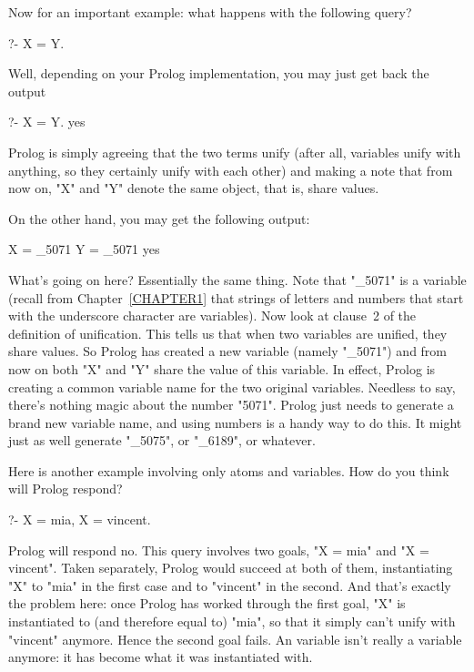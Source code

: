 Now for an important example: what happens with the following query?
\begin{LPNcodedisplay}
?- X = Y.
\end{LPNcodedisplay}
%
Well, depending on your Prolog implementation, you may just get back
the output
\begin{LPNcodedisplay}
?- X = Y.
yes
\end{LPNcodedisplay}
%
Prolog is simply agreeing that the two terms unify (after all,
variables unify with anything, so they certainly unify with each
other) and making a note that from now on, "X" and "Y" denote the same
object, that is, share values.

On the other hand, you may get the following output:
\begin{LPNcodedisplay}
X = _5071
Y = _5071
yes
\end{LPNcodedisplay}
What's going on here?  Essentially the same thing. Note that "_5071"
is a variable (recall from Chapter~\ref{CHAPTER1} that strings of
letters and numbers that start with the underscore character are
variables).  Now look at clause~2 of the definition of
unification. This tells us that when two variables are unified, they
share values. So Prolog has created a new variable (namely "_5071")
and from now on both "X" and "Y" share the value of this variable. In
effect, Prolog is creating a common variable name for the two original
variables.  Needless to say, there's nothing magic about the number
"5071".  Prolog just needs to generate a brand new variable name, and
using numbers is a handy way to do this. It might just as well
generate "_5075", or "_6189", or whatever.

Here is another example involving only atoms and variables. How do you
think will Prolog respond?
\begin{LPNcodedisplay}
?- X = mia, X = vincent.
\end{LPNcodedisplay}


Prolog will respond no. This query involves two goals, "X = mia" and
"X = vincent". Taken separately, Prolog would succeed at both of them,
instantiating "X" to "mia" in the first case and to "vincent" in the
second. And that's exactly the problem here: once Prolog has worked
through the first goal, "X" is instantiated to (and therefore equal
to) "mia", so that it simply can't unify with "vincent" anymore.
Hence the second goal fails. An  variable isn't
really a variable anymore: it has become what it was instantiated with.

